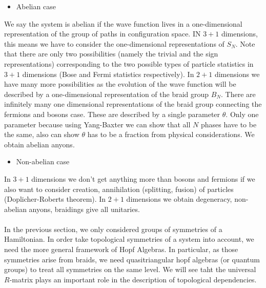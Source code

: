 \documentclass{article}
\begin{document}
\begin{itemize}
    \item Abelian case
\end{itemize}
We say the system is abelian if the wave function lives in a one-dimensional representation of the group of paths in configuration space. IN $3+1$ dimensions, this means we have to consider the one-dimensional representations of $S_N$. Note that there are only two possibilities (namely the trivial and the sign representations) corresponding to the two possible types of particle statistics in $3+1$ dimensions (Bose and Fermi statistics respectively).
In $2+1$ dimensions we have many more possibilities as the evolution of the wave function will be described by a one-dimensional representation of the braid group $B_N$. There are infinitely many one dimensional representations of the braid group connecting the fermions and bosons case. These are described by a single parameter $\theta$. Only one parameter because using Yang-Baxter we can show that all $N$ phases have to be the same, also can show $\theta$ has to be a fraction from physical considerations. We obtain abelian anyons.\\
\begin{itemize}
    \item Non-abelian case
\end{itemize}
In $3+1$ dimensions we don't get anything more than bosons and fermions if we also want to consider creation, annihilation (splitting, fusion) of particles (Doplicher-Roberts theorem). 
In $2+1$ dimensions we obtain degeneracy, non-abelian anyons, braidings give all unitaries.\\~\\
In the previous section, we only considered groups of symmetries of a Hamiltonian. In order take topological symmetries of a system into account, we need the more general framework of Hopf Algebras. In particular, as those symmetries arise from braids, we need quasitriangular hopf algebras (or quantum groups) to treat all symmetries on the same level. We will see taht the universal $R$-matrix plays an important role in the description of topological dependencies.\\

\end{document}
